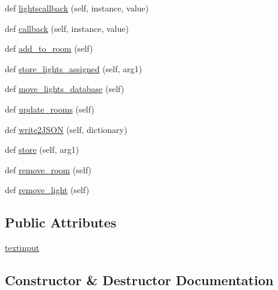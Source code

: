 \begin{DoxyCompactItemize}
\item 
def \hyperlink{classTestingGUI_1_1LightsView_abc44bd1d87c0d060890ad095b6195d27}{lightscallback} (self, instance, value)
\item 
def \hyperlink{classTestingGUI_1_1LightsView_a6868b6f77d43e03f6568b62169c9b19c}{callback} (self, instance, value)
\item 
def \hyperlink{classTestingGUI_1_1LightsView_a38460cbc7553198ef9a613d09919e077}{add\+\_\+to\+\_\+room} (self)
\item 
def \hyperlink{classTestingGUI_1_1LightsView_a3ff5b4674219060370bd91c84e99513c}{store\+\_\+lights\+\_\+assigned} (self, arg1)
\item 
def \hyperlink{classTestingGUI_1_1LightsView_ad2a97175fc114e694c6fe598361c6334}{move\+\_\+lights\+\_\+database} (self)
\item 
def \hyperlink{classTestingGUI_1_1LightsView_add6c257a4625658791c08aca275dbe4d}{update\+\_\+rooms} (self)
\item 
def \hyperlink{classTestingGUI_1_1LightsView_a363b48af2153effb586500f5ca0f371d}{write2\+J\+S\+ON} (self, dictionary)
\item 
def \hyperlink{classTestingGUI_1_1LightsView_a956aabd6c68ac0028a5dbc46ae9475ad}{store} (self, arg1)
\item 
def \hyperlink{classTestingGUI_1_1LightsView_a5f41c66493303b7174b335356d4deee5}{remove\+\_\+room} (self)
\item 
def \hyperlink{classTestingGUI_1_1LightsView_aa302b8817251a5f3c0f2c0d153073399}{remove\+\_\+light} (self)
\end{DoxyCompactItemize}
\subsection*{Public Attributes}
\begin{DoxyCompactItemize}
\item 
\hyperlink{classTestingGUI_1_1LightsView_aa809676a8370b352332b15861fac843e}{textinput}
\end{DoxyCompactItemize}


\subsection{Constructor \& Destructor Documentation}
